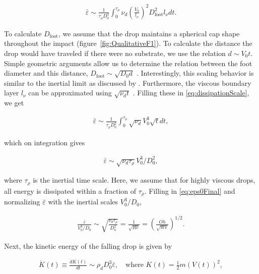 \documentclass{jfm}
\begin{document}
\begin{align}\label{eq:dissipationScale}
	\bar{\varepsilon} \sim \frac{1}{\tau_\rho D_0^3}\int_0^{\tau_\rho}\nu_d \left(\frac{V_0}{l_\nu}\right)^2 D_{\text{foot}}^2l_\nu dt.
\end{align}

\noindent To calculate $D_{\text{foot}}$, we assume that the drop maintains a spherical cap shape throughout the impact (figure~\ref{fig:QualitativeF1}). To calculate the distance the drop would have traveled if there were no substrate, we use the relation $d \sim V_0t$. Simple geometric arguments allow us to determine the relation between the foot diameter and this distance, $D_{\text{foot}} \sim \sqrt{D_0d}$ \citep{lesser1981analytic, mandre2009precursors,  zheng2021air, bilotto2023fluid, bertin2023similarity}. Interestingly, this scaling behavior is similar to the inertial limit \citep{wagner1932stoss, Bouwhuis2012, Philippi2016, gordillo2019theory} as discussed by \citet{langley2017impact, bilotto2023fluid}. Furthermore, the viscous boundary layer $l_\nu$ can be approximated using $\sqrt{\nu_d t}$ \citep{mirels1955laminar, Eggers2010, Philippi2016}. Filling these in \eqref{eq:dissipationScale}, we get

\begin{align}	
	\bar{\varepsilon} \sim \frac{1}{\tau_\rho D_0^2}\int_0^{\tau_\rho}\sqrt{\nu_d} V_0^3 \sqrt{t} dt,
\end{align}

\noindent which on integration gives 

\begin{align}\label{eq:eps0Final}
	\bar{\varepsilon} \sim \sqrt{\nu_d \tau_\rho}V_0^3/D_0^2, 
\end{align}

\noindent where $\tau_\rho$ is the inertial time scale. Here, we assume that for highly viscous drops, all energy is dissipated within a fraction of $\tau_\rho$. Filling in \eqref{eq:eps0Final} and normalizing $\bar{\varepsilon}$ with the inertial scales $V_0^3/D_0$,

\begin{align}\label{eq:DissipationScale}
	\frac{\bar{\varepsilon}}{V_0^3/D_0} \sim \sqrt{\frac{\nu_d\tau_\rho}{D_0^2}} = \frac{1}{\sqrt{Re}} = \left(\frac{Oh}{\sqrt{We}}\right)^{1/2}.
\end{align}

\noindent Next, the kinetic energy of the falling drop is given by

\begin{align}\label{eq:KEdissipation}
	\dot{K}(t) \equiv \frac{dK(t)}{dt} \sim \rho_dD_0^3\bar{\varepsilon},\quad\text{where } K(t) = \frac{1}{2}m\left(V(t)\right)^2,
\end{align}
\end{document}
